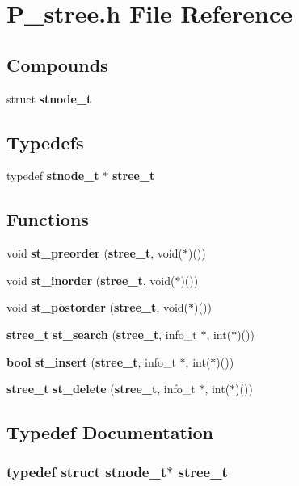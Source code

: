 \section{P\_\-stree.h File Reference}
\label{P__stree_8h}
\subsection*{Compounds}
\begin{CompactItemize}
\item 
struct {\bf stnode\_\-t}
\end{CompactItemize}
\subsection*{Typedefs}
\begin{CompactItemize}
\item 
typedef {\bf stnode\_\-t} $\ast$ {\bf stree\_\-t}
\end{CompactItemize}
\subsection*{Functions}
\begin{CompactItemize}
\item 
void {\bf st\_\-preorder} ({\bf stree\_\-t}, void($\ast$)())
\item 
void {\bf st\_\-inorder} ({\bf stree\_\-t}, void($\ast$)())
\item 
void {\bf st\_\-postorder} ({\bf stree\_\-t}, void($\ast$)())
\item 
{\bf stree\_\-t} {\bf st\_\-search} ({\bf stree\_\-t}, info\_\-t $\ast$, int($\ast$)())
\item 
{\bf bool} {\bf st\_\-insert} ({\bf stree\_\-t}, info\_\-t $\ast$, int($\ast$)())
\item 
{\bf stree\_\-t} {\bf st\_\-delete} ({\bf stree\_\-t}, info\_\-t $\ast$, int($\ast$)())
\end{CompactItemize}


\subsection{Typedef Documentation}
\subsubsection{\setlength{\rightskip}{0pt plus 5cm}typedef struct {\bf stnode\_\-t}$\ast$ stree\_\-t}\label{P__stree_8h_a0}




